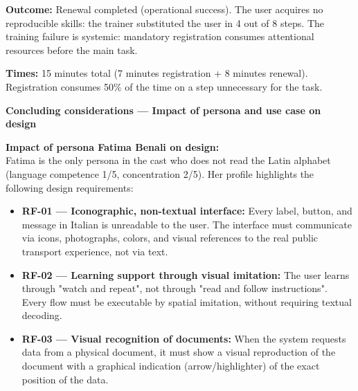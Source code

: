 ﻿\documentclass[11pt,a4paper]{article}
\begin{document}
\begin{center}
\begin{tcolorbox}[base]
{    \textbf{Outcome:} Renewal completed (operational success). The user acquires no reproducible skills: the trainer substituted the user in 4 out of 8 steps. The training failure is systemic: mandatory registration consumes attentional resources before the main task.

    \textbf{Times:} 15 minutes total (7 minutes registration + 8 minutes renewal). Registration consumes 50\% of the time on a step unnecessary for the task.
    }
\end{tcolorbox}

\begin{tcolorbox}[sectionbox,colback=primaryColor!10]
    \textbf{Concluding considerations --- Impact of persona and use case on design}
\end{tcolorbox}

\vspace{0.3cm}

\begin{tcolorbox}[base]
    {\small
    \textbf{Impact of persona Fatima Benali on design:} \\[4pt]
    Fatima is the only persona in the cast who does not read the Latin alphabet (language competence 1/5, concentration 2/5). Her profile highlights the following design requirements:

    \begin{itemize}[leftmargin=*]
        \item \textbf{RF-01 --- Iconographic, non-textual interface:}
        Every label, button, and message in Italian is unreadable to the user. The interface must communicate via icons, photographs, colors, and visual references to the real public transport experience, not via text.

        \item \textbf{RF-02 --- Learning support through visual imitation:}
        The user learns through "watch and repeat", not through "read and follow instructions". Every flow must be executable by spatial imitation, without requiring textual decoding.

        \item \textbf{RF-03 --- Visual recognition of documents:}
        When the system requests data from a physical document, it must show a visual reproduction of the document with a graphical indication (arrow/highlighter) of the exact position of the data.


\end{itemize}}
\end{tcolorbox}
\end{center}
\end{document}
